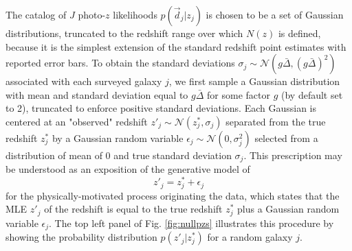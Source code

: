 \documentclass[preprint]{aastex}
\begin{document}
The catalog of $J$ photo-$z$ likelihoods $p(\vec{d}_{j}|z_{j})$ is chosen to be 
a set of Gaussian distributions, truncated to the redshift range over which 
$N(z)$ is defined, because it is the simplest extension of the standard 
redshift point estimates with reported error bars.  To obtain the standard 
deviations $\sigma_{j}\sim\mathcal{N}(g\bar{\Delta},(g\bar{\Delta})^{2})$ 
associated with each surveyed galaxy $j$, we first sample a Gaussian 
distribution with mean and standard deviation equal to $g\bar{\Delta}$ for some 
factor $g$ (by default set to 2), truncated to enforce positive standard 
deviations.  Each Gaussian is centered at an "observed" redshift 
$z'_{j}\sim\mathcal{N}(z^{*}_{j},\sigma_{j})$ separated from the true redshift 
$z^{*}_{j}$ by a Gaussian random variable 
$\epsilon_{j}\sim\mathcal{N}(0,\sigma^{2}_{j})$ selected from a distribution of 
mean of 0 and true standard deviation $\sigma_{j}$.   This prescription may be 
understood as an exposition of the generative model of 
\begin{equation}
\label{eq:genmod}
z'_{j} = z^{*}_{j}+\epsilon_{j}
\end{equation}
for the physically-motivated process originating the data, which states that 
the MLE $z'_{j}$ of the redshift is equal to the true redshift $z^{*}_{j}$ plus 
a Gaussian random variable $\epsilon_{j}$.  The top left panel of Fig. 
\ref{fig:nullpzs} illustrates this procedure by showing the probability 
distribution $p(z'_{j}|z^{*}_{j})$ for a random galaxy $j$.
\end{document}
